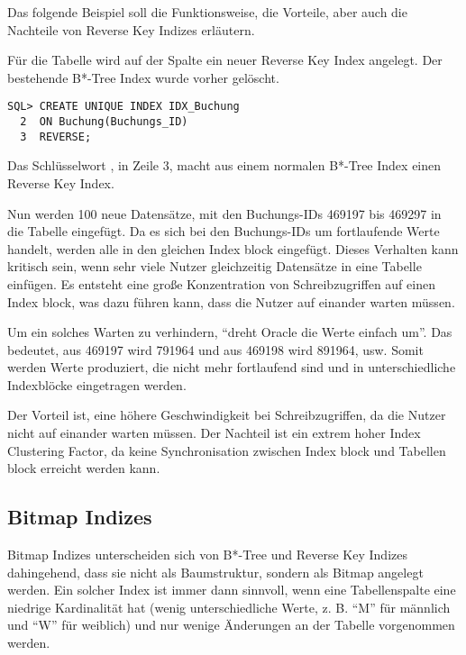         Das folgende Beispiel soll die Funktionsweise, die Vorteile, aber auch die Nachteile von Reverse Key Indizes erläutern.

        Für die Tabelle  wird auf der Spalte  ein neuer Reverse Key Index angelegt. Der bestehende B*-Tree Index wurde vorher gelöscht.
        \begin{lstlisting}[caption={Einen Reverse Key Index anlegen},label=admin320,language=oracle_sql]
SQL> CREATE UNIQUE INDEX IDX_Buchung
  2  ON Buchung(Buchungs_ID)
  3  REVERSE;
        \end{lstlisting}
        \begin{merke}
          Das Schlüsselwort , in Zeile 3, macht aus einem normalen B*-Tree Index einen Reverse Key Index.
        \end{merke}
\clearpage
        Nun werden 100 neue Datensätze, mit den Buchungs-IDs 469197 bis 469297 in die Tabelle eingefügt. Da es sich bei den Buchungs-IDs um fortlaufende Werte handelt, werden alle in den gleichen Index block eingefügt. Dieses Verhalten kann kritisch sein, wenn sehr viele Nutzer gleichzeitig Datensätze in eine Tabelle einfügen. Es entsteht eine große Konzentration von Schreibzugriffen auf einen Index block, was dazu führen kann, dass die Nutzer auf einander warten müssen.

        Um ein solches Warten zu verhindern, \enquote{dreht Oracle die Werte einfach um}. Das bedeutet, aus 469197 wird 791964 und aus 469198 wird 891964, usw. Somit werden Werte produziert, die nicht mehr fortlaufend sind und in unterschiedliche Indexblöcke eingetragen werden.

        Der Vorteil ist, eine höhere Geschwindigkeit bei Schreibzugriffen, da die Nutzer nicht auf einander warten müssen. Der Nachteil ist ein extrem hoher Index Clustering Factor, da keine Synchronisation zwischen Index block und Tabellen block erreicht werden kann.
      \subsection{Bitmap Indizes}
        Bitmap Indizes unterscheiden sich von B*-Tree und Reverse Key Indizes dahingehend, dass sie nicht als Baumstruktur, sondern als Bitmap angelegt werden. Ein solcher Index ist immer dann sinnvoll, wenn eine Tabellenspalte eine niedrige Kardinalität hat (wenig unterschiedliche Werte, z. B. \enquote{M} für männlich und \enquote{W} für weiblich) und nur wenige Änderungen an der Tabelle vorgenommen werden.

